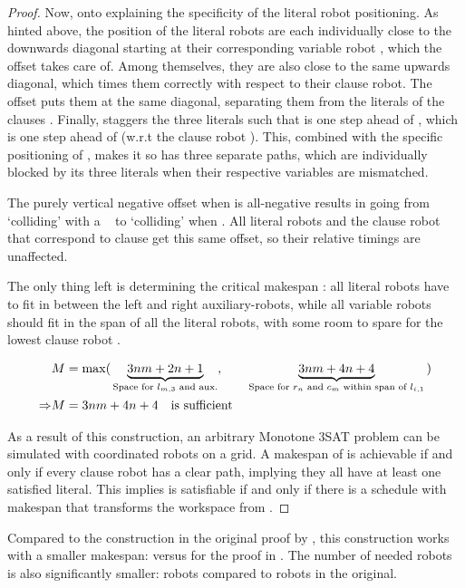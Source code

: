 \begin{proof}
	Now, onto explaining the specificity of the literal robot positioning. As hinted above, the position of the literal robots  are each individually close to the downwards diagonal starting at their corresponding variable robot , which the offset  takes care of. Among themselves, they are also close to the same upwards diagonal, which times them correctly with respect to their clause robot. The offset  puts them at the same diagonal, separating them from the literals of the clauses . Finally,  staggers the three literals such that  is one step ahead of , which is one step ahead of  (w.r.t the clause robot ). This, combined with the specific positioning of , makes it so  has three separate paths, which are individually blocked by its three literals when their respective variables are mismatched.

	The purely vertical negative offset \ilmath{\phi} when  is all-negative results in  going from `colliding' with a \false\  to `colliding' when . All literal robots  and the clause robot  that correspond to clause  get this same offset, so their relative timings are unaffected.
	
	The only thing left is determining the critical makespan : all literal robots have to fit in between the left and right auxiliary-robots, while all variable robots should fit in the span of all the literal robots, with some room to spare for the lowest clause robot .

	\begin{align*}
		& M = \max (\, 
			\underbrace{3nm + 2n + 1}_{\text{Space for \( l_{m,3} \) and aux.}}, \qquad
			\underbrace{3nm + 4n + 4}_{\text{Space for \( r_n \) and \( c_m \) within span of \( l_{i,1} \)}}
		 \,) \\
		\Rightarrow & M = 3nm + 4n + 4 \quad \text{is sufficient}
	\end{align*}

	As a result of this construction, an arbitrary Monotone 3SAT problem can be simulated with coordinated robots on a grid. A makespan of  is achievable if and only if every clause robot has a clear path, implying they all have at least one satisfied literal. This implies \ilmath{\varphi} is satisfiable if and only if there is a schedule with makespan  that transforms the workspace from .
\end{proof}


Compared to the construction in the original proof by \cite{siamcomp/DemaineFKMS19}, this construction works with a smaller makespan:  versus  for the proof in \cite{siamcomp/DemaineFKMS19}. The number of needed robots is also significantly smaller:  robots compared to  robots in the original. 


